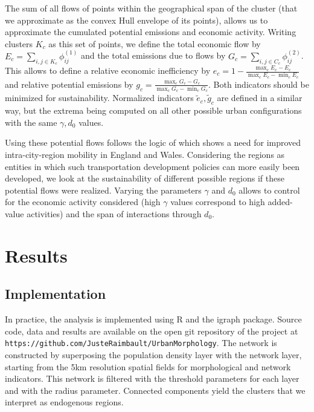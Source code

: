 \documentclass{article}
\begin{document}
The sum of all flows of points within the geographical span of the cluster (that we approximate as the convex Hull envelope of its points), allows us to approximate the cumulated potential emissions and economic activity. Writing clusters $K_c$ as this set of points, we define the total economic flow by $E_c = \sum_{i,j \in K_c} \phi_{ij}^{(1)}$ and the total emissions due to flows by $G_c = \sum_{i,j \in C_c} \phi_{ij}^{(2)}$. This allows to define a relative economic inefficiency by $e_c = 1 - \frac{\max_c E_c - E_c}{\max_c E_c - \min_c E_c}$ and relative potential emissions by $g_c = \frac{\max_c G_c - G_c}{\max_c G_c - \min_c G_c}$. Both indicators should be minimized for sustainability. Normalized indicators $\tilde{e}_c,\tilde{g}_c$ are defined in a similar way, but the extrema being computed on all other possible urban configurations with the same $\gamma,d_0$ values.

Using these potential flows follows the logic of \cite{arbabi2019development} which shows a need for improved intra-city-region mobility in England and Wales. Considering the regions as entities in which such transportation development policies can more easily been developed, we look at the sustainability of different possible regions if these potential flows were realized. Varying the parameters $\gamma$ and $d_0$ allows to control for the economic activity considered (high $\gamma$ values correspond to high added-value activities) and the span of interactions through $d_0$.



\section{Results}

\subsection{Implementation}


In practice, the analysis is implemented using R and the igraph package. Source code, data and results are available on the open git repository of the project at \texttt{https://github.com/JusteRaimbault/UrbanMorphology}. The network is constructed by superposing the population density layer with the network layer, starting from the 5km resolution spatial fields for morphological and network indicators. This network is filtered with the threshold parameters for each layer and with the radius parameter. Connected components yield the clusters that we interpret as endogenous regions.
\end{document}
